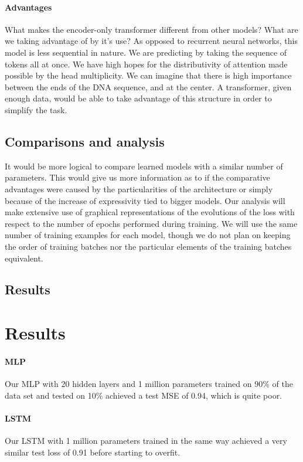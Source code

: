 \documentclass{article}
\begin{document}
\paragraph{Advantages}
What makes the encoder-only transformer different from other models? What are
we taking advantage of by it's use? As opposed to recurrent neural networks, 
this model is less sequential in nature. We are predicting by 
taking the sequence of tokens all at once. We have high hopes for the 
distributivity of attention made possible by the head multiplicity.
We can imagine that there is high importance between the ends of the DNA 
sequence, and at the center. A transformer, given enough data, would 
be able to take advantage of this structure in order to simplify the task.


\subsection{Comparisons and analysis}
It would be more logical to compare learned models with a similar 
number of parameters. This would give us more information as 
to if the comparative advantages were caused by the particularities 
of the architecture or simply because of the increase of expressivity 
tied to bigger models. Our analysis will make extensive use of graphical 
representations of the evolutions of the loss with respect to the number 
of epochs performed during training. We will use the same number 
of training examples for each model, though we do not plan on keeping 
the order of training batches nor the particular elements of the training 
batches equivalent.

\subsection{Results}
\section{Results}

\paragraph{MLP} Our MLP with 20 hidden layers and 1 million parameters trained on 90\% of the data set and tested on 10\% achieved a test MSE of 0.94, which is quite poor.

\paragraph{LSTM} Our LSTM with 1 million parameters trained in the same way achieved a very similar test loss of 0.91 before starting to overfit.
\end{document}

